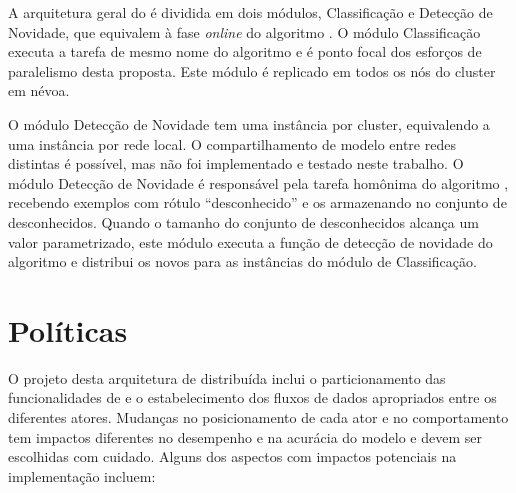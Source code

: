 
A arquitetura geral do \mfog é dividida em dois módulos, Classificação e
Detecção de Novidade, que equivalem à fase \emph{online} do algoritmo \minas.
O módulo Classificação executa a tarefa de mesmo nome do algoritmo \minas e é
ponto focal dos esforços de paralelismo desta proposta.
Este módulo é replicado em todos os nós do cluster %
em névoa.

O módulo Detecção de Novidade tem uma instância por cluster, equivalendo a uma
instância por rede local.
O compartilhamento de modelo entre redes distintas é possível, mas não foi
implementado e testado neste trabalho.
% 
O módulo Detecção de Novidade é responsável pela tarefa homônima do algoritmo
\minas, recebendo exemplos com rótulo ``desconhecido'' e os armazenando no
conjunto de desconhecidos.
Quando o tamanho do conjunto de desconhecidos alcança um valor parametrizado,
este módulo executa a função de detecção de novidade do algoritmo \minas
e distribui os novos \mclusters para as instâncias do módulo de Classificação.

\section{Políticas}\label{sec:polices}

O projeto desta arquitetura de \nd distribuída inclui o particionamento das
funcionalidades de \minas e o estabelecimento dos fluxos de dados apropriados
entre os diferentes atores.
Mudanças no posicionamento de cada ator e no comportamento tem impactos
diferentes no desempenho e na acurácia do modelo e devem ser escolhidas com
cuidado.
% 
Alguns dos aspectos com impactos potenciais na implementação incluem:

